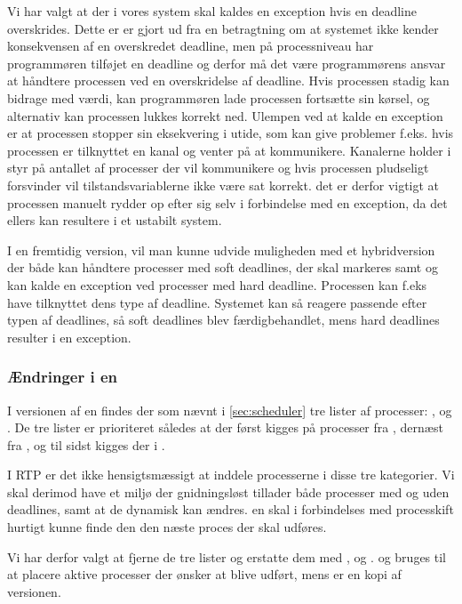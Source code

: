 Vi har valgt at der i vores system skal kaldes en exception hvis en deadline overskrides. Dette er er gjort ud fra en betragtning om at systemet ikke kender konsekvensen af en overskredet deadline, men på processniveau har programmøren tilføjet en deadline og derfor må det være programmørens ansvar at håndtere processen ved en overskridelse af deadline.  Hvis processen stadig kan bidrage med værdi, kan programmøren lade processen fortsætte sin kørsel, og alternativ kan processen lukkes korrekt ned. Ulempen ved at kalde en exception er at processen stopper sin eksekvering i utide, som kan give problemer f.eks. hvis processen er tilknyttet en kanal og venter på at kommunikere.  Kanalerne holder i \pycsp styr på antallet af processer der vil kommunikere og hvis processen pludseligt forsvinder vil tilstandsvariablerne ikke være sat korrekt. det er derfor vigtigt at processen manuelt rydder op efter sig selv i forbindelse med en exception, da det ellers kan resultere i et ustabilt system.

I en fremtidig version, vil man kunne udvide muligheden med et hybridversion der både kan håndtere processer med soft deadlines, der skal markeres samt og kan kalde en exception ved processer med hard deadline. Processen kan f.eks have  tilknyttet dens type af deadline. Systemet kan så reagere passende efter typen af deadlines, så soft deadlines blev færdigbehandlet, mens hard deadlines resulter i en exception.


\subsubsection{Ændringer i \sched en}
I  versionen af \sched en findes der som nævnt i \cref{sec:scheduler} tre lister af processer: ,  og . De tre lister er prioriteret således at der først kigges på processer fra , dernæst fra , og til sidst kigges der i .

I RTP er det ikke hensigtsmæssigt at inddele processerne i disse tre  kategorier. Vi skal derimod have et miljø der gnidningsløst tillader både processer med og uden deadlines, samt at de dynamisk kan ændres. \sched en skal i forbindelses med processkift hurtigt kunne finde den den næste proces der skal udføres.

Vi har derfor valgt at fjerne  de tre lister og erstatte dem  med ,   og .  og    bruges til at placere  aktive processer der ønsker at blive udført, mens   er en kopi af \des versionen. 

